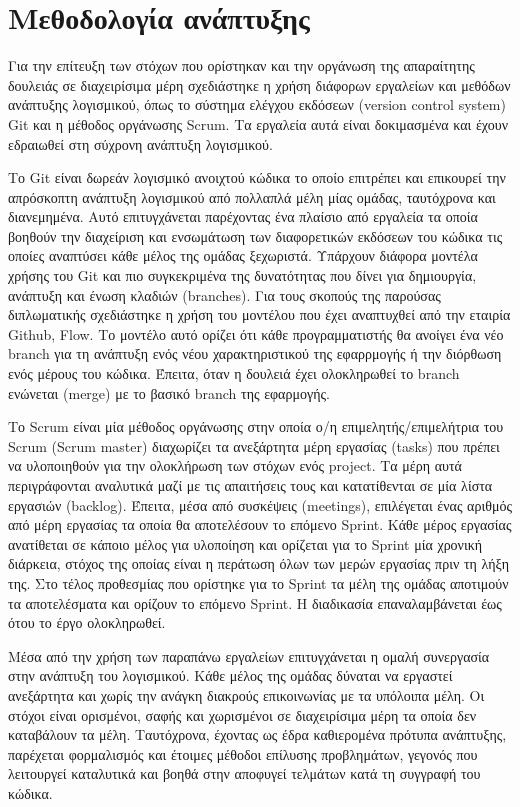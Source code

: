 \section{Μεθοδολογία ανάπτυξης}

Για την επίτευξη των στόχων που ορίστηκαν και την οργάνωση της απαραίτητης δουλειάς σε διαχειρίσιμα μέρη σχεδιάστηκε η χρήση διάφορων εργαλείων και μεθόδων ανάπτυξης λογισμικού, όπως το σύστημα ελέγχου εκδόσεων (version control system) Git και η μέθοδος οργάνωσης Scrum. Τα εργαλεία αυτά είναι δοκιμασμένα και έχουν εδραιωθεί στη σύχρονη ανάπτυξη λογισμικού.

Το Git είναι δωρεάν λογισμικό ανοιχτού κώδικα το οποίο επιτρέπει και επικουρεί την απρόσκοπτη ανάπτυξη λογισμικού από πολλαπλά μέλη μίας ομάδας, ταυτόχρονα και διανεμημένα. Αυτό επιτυγχάνεται παρέχοντας ένα πλαίσιο από εργαλεία τα οποία βοηθούν την διαχείριση και ενσωμάτωση των διαφορετικών εκδόσεων του κώδικα τις οποίες αναπτύσει κάθε μέλος της ομάδας ξεχωριστά. Υπάρχουν διάφορα μοντέλα χρήσης του Git και πιο συγκεκριμένα της δυνατότητας που δίνει για δημιουργία, ανάπτυξη και ένωση κλαδιών (branches). Για τους σκοπούς της παρούσας διπλωματικής σχεδιάστηκε η χρήση του μοντέλου που έχει αναπτυχθεί από την εταιρία Github, Flow. Το μοντέλο αυτό ορίζει ότι κάθε προγραμματιστής θα ανοίγει ένα νέο branch για τη ανάπτυξη ενός νέου χαρακτηριστικού της εφαρρμογής ή την διόρθωση ενός μέρους του κώδικα. Έπειτα, όταν η δουλειά έχει ολοκληρωθεί το branch ενώνεται (merge) με το βασικό branch της εφαρμογής.

Το Scrum είναι μία μέθοδος οργάνωσης στην οποία ο/η επιμελητής/επιμελήτρια του Scrum (Scrum master) διαχωρίζει τα ανεξάρτητα μέρη εργασίας (tasks) που πρέπει να υλοποιηθούν για την ολοκλήρωση των στόχων ενός project. Τα μέρη αυτά περιγράφονται αναλυτικά μαζί με τις απαιτήσεις τους και κατατίθενται σε μία λίστα εργασιών (backlog). Έπειτα, μέσα από συσκέψεις (meetings), επιλέγεται ένας αριθμός από μέρη εργασίας τα οποία θα αποτελέσουν το επόμενο Sprint. Κάθε μέρος εργασίας ανατίθεται σε κάποιο μέλος για υλοποίηση και ορίζεται για το Sprint μία χρονική διάρκεια, στόχος της οποίας είναι η περάτωση όλων των μερών εργασίας πριν τη λήξη της. Στο τέλος προθεσμίας που ορίστηκε για το Sprint τα μέλη της ομάδας αποτιμούν τα αποτελέσματα και ορίζουν το επόμενο Sprint. Η διαδικασία επαναλαμβάνεται έως ότου το έργο ολοκληρωθεί.

Μέσα από την χρήση των παραπάνω εργαλείων επιτυγχάνεται η ομαλή συνεργασία στην ανάπτυξη του λογισμικού. Κάθε μέλος της ομάδας δύναται να εργαστεί ανεξάρτητα και χωρίς την ανάγκη διακρούς επικοινωνίας με τα υπόλοιπα μέλη. Οι στόχοι είναι ορισμένοι, σαφής και χωρισμένοι σε διαχειρίσιμα μέρη τα οποία δεν καταβάλουν τα μέλη. Ταυτόχρονα, έχοντας ως έδρα καθιερομένα πρότυπα ανάπτυξης, παρέχεται φορμαλισμός και έτοιμες μέθοδοι επίλυσης προβλημάτων, γεγονός που λειτουργεί καταλυτικά και βοηθά στην αποφυγεί τελμάτων κατά τη συγγραφή του κώδικα.
